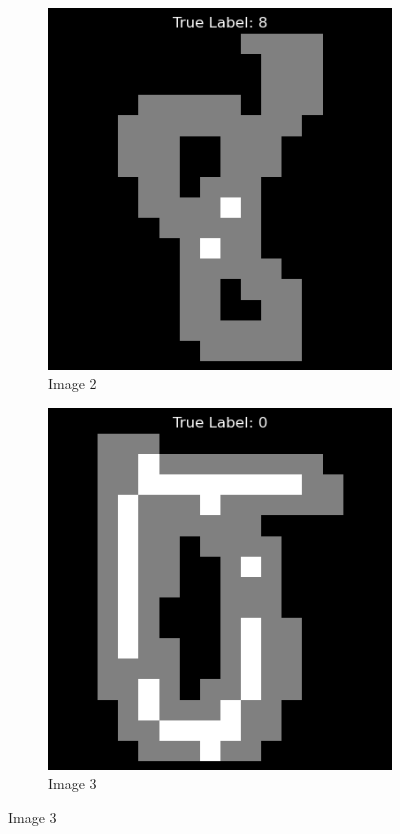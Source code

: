 \documentclass[final,3p,times,12pt]{article}
\begin{document}
\begin{figure}[H]
{\begin{minipage}{\linewidth}
\begin{subfigure}[b]{0.3\linewidth}
                \centering
                \includegraphics[width=\linewidth]{images/image_2.png}
                \caption{Image 2}
                \label{fig:image2}
            \end{subfigure}
            \hfill
            \begin{subfigure}[b]{0.3\linewidth}
                \centering
                \includegraphics[width=\linewidth]{images/image_3.png}
                \caption{Image 3}
                \label{fig:image3}
            \end{subfigure}


\end{minipage}}
\end{figure}
\end{document}
